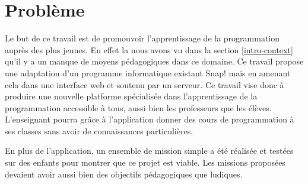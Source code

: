 \section{Problème}
\label{into-problem}
Le but de ce travail est de promouvoir l'apprentissage de la programmation auprès des plus jeunes. En effet la nous avons vu dans la section \ref{intro-context} qu'il y a un manque de moyens pédagogiques dans ce domaine. Ce travail propose une adaptation d'un programme informatique existant Snap! mais en amenant cela dans une interface web et soutenu par un serveur. Ce travail vise donc à produire une nouvelle platforme spécialisée dans l'apprentissage de la programmation accessible à tous, aussi bien les professeurs que les élèves. L'enseignant pourra grâce à l'application donner des cours de programmation à ses classes sans avoir de connaissances particulières.

En plus de l'application, un ensemble de mission simple a été réalisée et testées sur des enfants pour montrer que ce projet est viable. Les missions proposées devaient avoir aussi bien des objectifs pédagogiques que ludiques.
